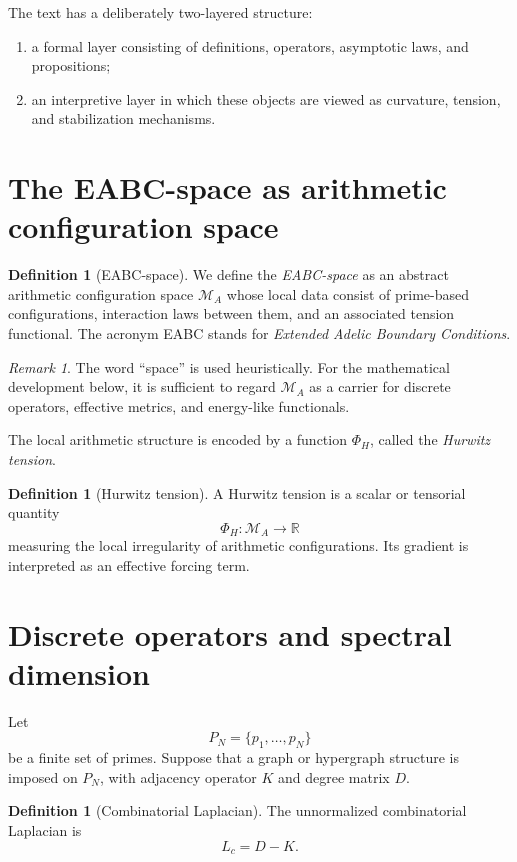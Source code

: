 \documentclass[11pt,a4paper]{amsart}
\theoremstyle{plain}
\theoremstyle{definition}
\newtheorem{definition}[theorem]{Definition}
\theoremstyle{remark}
\newtheorem{remark}[theorem]{Remark}
\newcommand{\RR}{\mathbb{R}}
\newcommand{\MA}{\mathcal{M}_A}
\newcommand{\PhiH}{\Phi_H}
\newcommand{\Lc}{L_c}
\begin{document}
	The text has a deliberately two-layered structure:
	\begin{enumerate}[label=\arabic*.]
		\item a formal layer consisting of definitions, operators, asymptotic laws, and propositions;
		\item an interpretive layer in which these objects are viewed as curvature, tension, and stabilization mechanisms.
	\end{enumerate}
	
	\section{The EABC-space as arithmetic configuration space}
	
	\begin{definition}[EABC-space]
		We define the \emph{EABC-space} as an abstract arithmetic configuration space $\MA$ whose local data consist of prime-based configurations, interaction laws between them, and an associated tension functional. The acronym EABC stands for \emph{Extended Adelic Boundary Conditions}.
	\end{definition}
	
	\begin{remark}
		The word ``space'' is used heuristically. For the mathematical development below, it is sufficient to regard $\MA$ as a carrier for discrete operators, effective metrics, and energy-like functionals.
	\end{remark}
	
	The local arithmetic structure is encoded by a function $\PhiH$, called the \emph{Hurwitz tension}.
	
	\begin{definition}[Hurwitz tension]
		A Hurwitz tension is a scalar or tensorial quantity
		\[
		\PhiH:\MA \to \RR
		\]
		measuring the local irregularity of arithmetic configurations. Its gradient is interpreted as an effective forcing term.
	\end{definition}
	
	\section{Discrete operators and spectral dimension}
	
	Let
	\[
	P_N=\{p_1,\dots,p_N\}
	\]
	be a finite set of primes. Suppose that a graph or hypergraph structure is imposed on $P_N$, with adjacency operator $K$ and degree matrix $D$.
	
	\begin{definition}[Combinatorial Laplacian]
		The unnormalized combinatorial Laplacian is
		\[
		\Lc = D-K.
		\]
	\end{definition}
	
\end{document}
